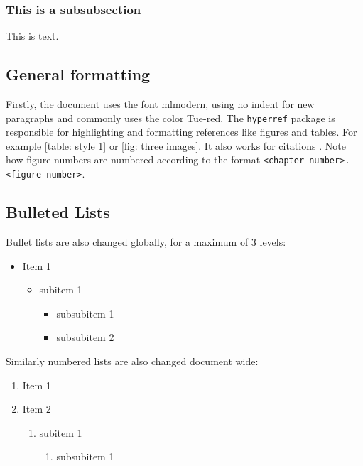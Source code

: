 \documentclass[a4paper, table]{article}
\begin{document}
    \subsubsection{This is a subsubsection}
    This is text.

\subsection{General formatting}
Firstly, the document uses the font mlmodern, using no indent for new paragraphs and commonly uses the color \textcolor{Tue-red}{Tue-red}.
The \texttt{hyperref} package is responsible for highlighting and formatting references like figures and tables. For example \cref{table: style 1} or \cref{fig: three images}. It also works for citations \cite{texbook}. Note how figure numbers are numbered according to the format \texttt{<chapter number>.<figure number>}.\\

\subsection{Bulleted Lists}
Bullet lists are also changed globally, for a maximum of 3 levels:

\begin{itemize}
    \item Item 1
    \begin{itemize}
        \item subitem 1
        \begin{itemize}
            \item subsubitem 1
            \item subsubitem 2
        \end{itemize}
    \end{itemize}
\end{itemize}

Similarly numbered lists are also changed document wide:

\begin{enumerate}
    \item Item 1
    \item Item 2
    \begin{enumerate}
        \item subitem 1
        \begin{enumerate}
            \item subsubitem 1
        \end{enumerate}
    \end{enumerate}
\end{enumerate}
\end{document}
